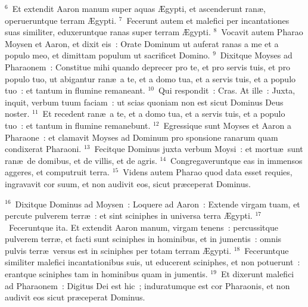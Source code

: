 ${}^{6}$~Et extendit Aaron manum super aquas \AE gypti, et ascenderunt ran\ae , operueruntque terram \AE gypti.
${}^{7}$~Fecerunt autem et malefici per incantationes suas similiter, eduxeruntque ranas super terram \AE gypti.
${}^{8}$~Vocavit autem Pharao Moysen et Aaron, et dixit eis~: Orate Dominum ut auferat ranas a me et a populo meo, et dimittam populum ut sacrificet Domino.
${}^{9}$~Dixitque Moyses ad Pharaonem~: Constitue mihi quando deprecer pro te, et pro servis tuis, et pro populo tuo, ut abigantur ran\ae\ a te, et a domo tua, et a servis tuis, et a populo tuo~: et tantum in flumine remaneant.
${}^{10}$~Qui respondit~: Cras. At ille~: Juxta, inquit, verbum tuum faciam~: ut scias quoniam non est sicut Dominus Deus noster.
${}^{11}$~Et recedent ran\ae\ a te, et a domo tua, et a servis tuis, et a populo tuo~: et tantum in flumine remanebunt.
${}^{12}$~Egressique sunt Moyses et Aaron a Pharaone~: et clamavit Moyses ad Dominum pro sponsione ranarum quam condixerat Pharaoni.
${}^{13}$~Fecitque Dominus juxta verbum Moysi~: et mortu\ae\ sunt ran\ae\ de domibus, et de villis, et de agris.
${}^{14}$~Congregaveruntque eas in immensos aggeres, et computruit terra.
${}^{15}$~Videns autem Pharao quod data esset requies, ingravavit cor suum, et non audivit eos, sicut pr\ae ceperat Dominus.


${}^{16}$~Dixitque Dominus ad Moysen~: Loquere ad Aaron~: Extende virgam tuam, et percute pulverem terr\ae~: et sint sciniphes in universa terra \AE gypti.
${}^{17}$~Feceruntque ita. Et extendit Aaron manum, virgam tenens~: percussitque pulverem terr\ae , et facti sunt sciniphes in hominibus, et in jumentis~: omnis pulvis terr\ae\ versus est in sciniphes per totam terram \AE gypti.
${}^{18}$~Feceruntque similiter malefici incantationibus suis, ut educerent sciniphes, et non potuerunt~: erantque sciniphes tam in hominibus quam in jumentis.
${}^{19}$~Et dixerunt malefici ad Pharaonem~: Digitus Dei est hic~; induratumque est cor Pharaonis, et non audivit eos sicut pr\ae ceperat Dominus.


